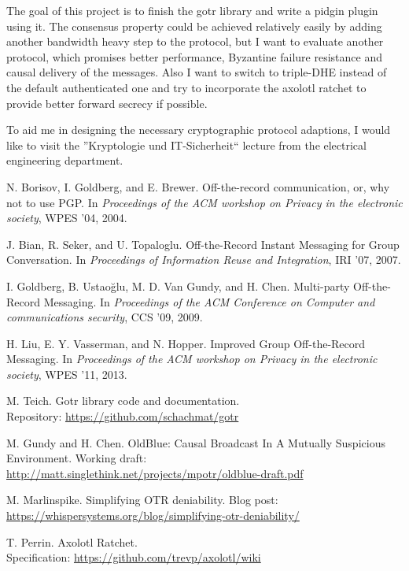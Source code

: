 The goal of this project is to finish the gotr library\cite{libgotr} and write a
pidgin plugin using it. The consensus property could be achieved relatively
easily by adding another bandwidth heavy step to the protocol, but I want to
evaluate another protocol\cite{oldblue}, which promises better performance,
Byzantine failure resistance and causal delivery of the messages. Also I want to
switch to triple-DHE\cite{tripledhe} instead of the default authenticated one
and try to incorporate the axolotl ratchet\cite{axolotl} to provide better
forward secrecy if possible.

To aid me in designing the necessary cryptographic protocol adaptions, I would
like to visit the ”Kryptologie und IT-Sicherheit“ lecture from the electrical
engineering department.

\begin{thebibliography}{xx}

	 N. Borisov, I. Goldberg, and E. Brewer. Off-the-record
		communication, or, why not to use PGP. In \textit{Proceedings of the ACM
		workshop on Privacy in the electronic society}, WPES ’04, 2004.

	 J. Bian, R. Seker, and U. Topaloglu. Off-the-Record Instant
		Messaging for Group Conversation. In \textit{Proceedings of Information
		Reuse and Integration}, IRI ’07, 2007.

	 I. Goldberg, B. Ustaoğlu, M. D. Van Gundy, and H. Chen.
		Multi-party Off-the-Record Messaging. In \textit{Proceedings of the ACM
		Conference on Computer and communications security}, CCS ’09, 2009.

	 H. Liu, E. Y. Vasserman, and N. Hopper. Improved Group
		Off-the-Record Messaging. In \textit{Proceedings of the ACM workshop on
		Privacy in the electronic society}, WPES ’11, 2013.

	 M. Teich.
		Gotr library code and documentation.\\Repository:
		\url{https://github.com/schachmat/gotr}

	 M. Gundy and H. Chen.
		OldBlue: Causal Broadcast In A Mutually Suspicious Environment.
		Working draft: \url{http://matt.singlethink.net/projects/mpotr/oldblue-draft.pdf}

	 M. Marlinspike.
		Simplifying OTR deniability. Blog post:
		\url{https://whispersystems.org/blog/simplifying-otr-deniability/}

	 T. Perrin.
		Axolotl Ratchet.\\Specification:
		\url{https://github.com/trevp/axolotl/wiki}

\end{thebibliography}


